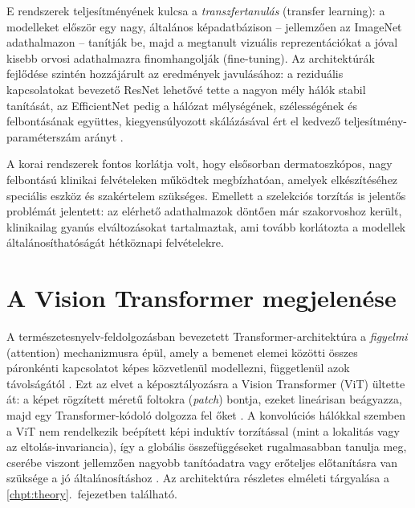 E rendszerek teljesítményének kulcsa a \textit{transzfertanulás} (transfer
learning): a modelleket először egy nagy, általános képadatbázison -- jellemzően
az ImageNet adathalmazon \cite{russakovsky2015imagenet} -- tanítják be, majd a
megtanult vizuális reprezentációkat a jóval kisebb orvosi adathalmazra finomhangolják
(fine-tuning). Az architektúrák fejlődése szintén hozzájárult az eredmények
javulásához: a reziduális kapcsolatokat bevezető ResNet \cite{he2016resnet}
lehetővé tette a nagyon mély hálók stabil tanítását, az EfficientNet pedig a
hálózat mélységének, szélességének és felbontásának együttes, kiegyensúlyozott
skálázásával ért el kedvező teljesítmény-paraméterszám arányt
\cite{tan2019efficientnet}.

A korai rendszerek fontos korlátja volt, hogy elsősorban dermatoszkópos, nagy
felbontású klinikai felvételeken működtek megbízhatóan, amelyek elkészítéséhez
speciális eszköz és szakértelem szükséges. Emellett a szelekciós torzítás is
jelentős problémát jelentett: az elérhető adathalmazok döntően már szakorvoshoz
került, klinikailag gyanús elváltozásokat tartalmaztak, ami tovább korlátozta a
modellek általánosíthatóságát hétköznapi felvételekre.

\section{A Vision Transformer megjelenése}

A természetesnyelv-feldolgozásban bevezetett Transformer-architektúra a
\textit{figyelmi} (attention) mechanizmusra épül, amely a bemenet elemei közötti
összes páronkénti kapcsolatot képes közvetlenül modellezni, függetlenül azok
távolságától \cite{vaswani2017attention}. Ezt az elvet a képosztályozásra a
Vision Transformer (ViT) ültette át: a képet rögzített méretű foltokra
(\textit{patch}) bontja, ezeket lineárisan beágyazza, majd egy Transformer-kódoló
dolgozza fel őket \cite{dosovitskiy2021vit}. A konvolúciós hálókkal szemben a ViT
nem rendelkezik beépített képi induktív torzítással (mint a lokalitás vagy az
eltolás-invariancia), így a globális összefüggéseket rugalmasabban tanulja meg,
cserébe viszont jellemzően nagyobb tanítóadatra vagy erőteljes előtanításra van
szüksége a jó általánosításhoz \cite{dosovitskiy2021vit}. Az architektúra
részletes elméleti tárgyalása a \ref{chpt:theory}.~fejezetben található.


